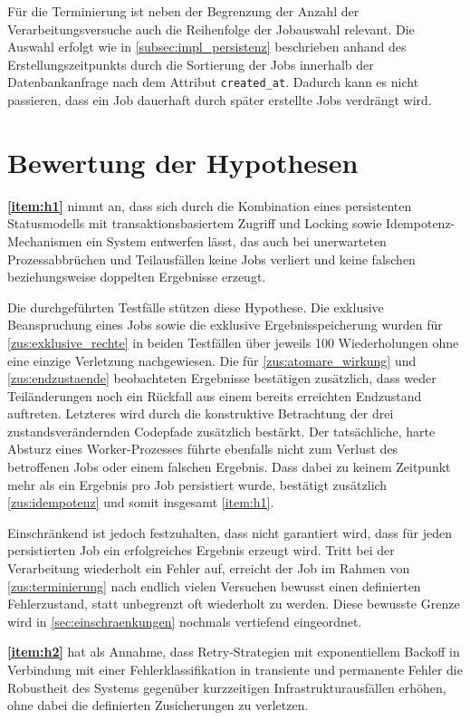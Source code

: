 Für die Terminierung ist neben der Begrenzung der Anzahl der Verarbeitungsversuche auch die Reihenfolge der Jobauswahl relevant.
Die Auswahl erfolgt wie in \cref{subsec:impl_persistenz} beschrieben anhand des Erstellungszeitpunkts durch die Sortierung
der Jobs innerhalb der Datenbankanfrage nach dem Attribut \texttt{created\_at}.
Dadurch kann es nicht passieren, dass ein Job dauerhaft durch später erstellte Jobs verdrängt wird.

\section{Bewertung der Hypothesen}
\label{sec:hypothesenbewertung}
\textbf{\ref{item:h1}} nimmt an, dass sich durch die Kombination eines persistenten Statusmodells mit
transaktionsbasiertem Zugriff und Locking sowie Idempotenz-Mechanismen ein System entwerfen lässt, das auch bei
unerwarteten Prozessabbrüchen und Teilausfällen keine Jobs verliert und keine falschen beziehungsweise doppelten Ergebnisse
erzeugt.

Die durchgeführten Testfälle stützen diese Hypothese.
Die exklusive Beanspruchung eines Jobs sowie die exklusive Ergebnisspeicherung wurden für \ref{zus:exklusive_rechte} in
beiden Testfällen über jeweils 100 Wiederholungen ohne eine einzige Verletzung nachgewiesen.
Die für \ref{zus:atomare_wirkung} und \ref{zus:endzustaende} beobachteten Ergebnisse bestätigen zusätzlich, dass weder
Teiländerungen noch ein Rückfall aus einem bereits erreichten Endzustand auftreten.
Letzteres wird durch die konstruktive Betrachtung der drei zustandsverändernden Codepfade zusätzlich bestärkt.
Der tatsächliche, harte Absturz eines Worker-Prozesses führte ebenfalls nicht zum Verlust des betroffenen Jobs oder einem falschen Ergebnis.
Dass dabei zu keinem Zeitpunkt mehr als ein Ergebnis pro Job persistiert wurde, bestätigt zusätzlich \ref{zus:idempotenz}
und somit insgesamt \ref{item:h1}.

Einschränkend ist jedoch festzuhalten, dass nicht garantiert wird, dass für jeden persistierten Job ein erfolgreiches Ergebnis erzeugt wird.
Tritt bei der Verarbeitung wiederholt ein Fehler auf, erreicht der Job im Rahmen von \ref{zus:terminierung} nach endlich
vielen Versuchen bewusst einen definierten Fehlerzustand, statt unbegrenzt oft wiederholt zu werden.
Diese bewusste Grenze wird in \cref{sec:einschraenkungen} nochmals vertiefend eingeordnet.

\textbf{\ref{item:h2}} hat als Annahme, dass Retry-Strategien mit exponentiellem Backoff in Verbindung mit einer
Fehlerklassifikation in transiente und permanente Fehler die Robustheit des Systems gegenüber
kurzzeitigen Infrastrukturausfällen erhöhen, ohne dabei die definierten Zusicherungen zu verletzen.

